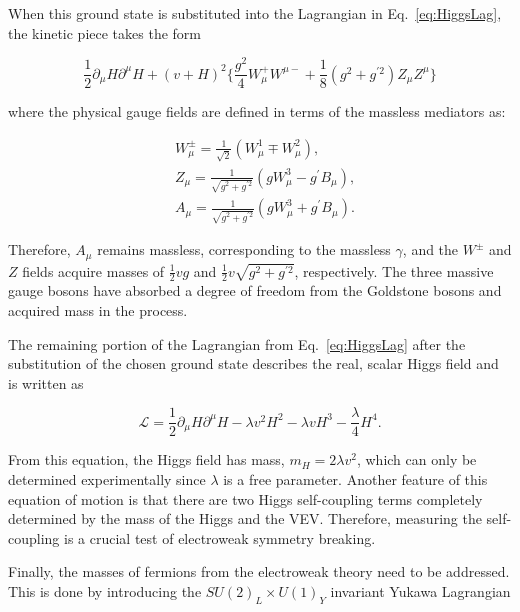 \noindent
When this ground state is substituted into the Lagrangian in Eq.~\ref{eq:HiggsLag}, the kinetic piece takes the form

\begin{equation}
\frac{1}{2}\partial_{\mu}H\partial^{\mu}H+(v + H)^{2}\Big\{\frac{g^{2}}{4}W_{\mu}^{+}W^{\mu-}+\frac{1}{8}(g^{2}+g^{\prime 2})Z_{\mu}Z^{\mu}\Big\}
\end{equation}

\noindent
where the physical gauge fields are defined in terms of the massless mediators as:

\begin{align}
&W^{\pm}_{\mu}=\frac{1}{\sqrt{2}}(W^{1}_{\mu}\mp W^{2}_{\mu}),
\\
&Z_{\mu}=\frac{1}{\sqrt{g^{2}+g^{\prime2}}}(gW_{\mu}^{3}-g^{\prime}B_{\mu}),
\\
&A_{\mu}=\frac{1}{\sqrt{g^{2}+g^{\prime2}}}(gW_{\mu}^{3}+g^{\prime}B_{\mu}).
\end{align}

\noindent
Therefore, $A_{\mu}$ remains massless, corresponding to the massless $\gamma$, and the $W^{\pm}$ and $Z$ fields acquire masses of $\frac{1}{2}v g$ and $\frac{1}{2}v\sqrt{g^{2}+g^{\prime 2}}$, respectively. The three massive gauge bosons have absorbed a degree of freedom from the Goldstone bosons and acquired mass in the process.

The remaining portion of the Lagrangian from Eq.~\ref{eq:HiggsLag} after the substitution of the chosen ground state describes the real, scalar Higgs field and is written as

\begin{equation}
\mathcal{L}=\frac{1}{2}\partial_{\mu}H\partial^{\mu}H -\lambda v^{2}H^{2}-\lambda v H^{3}-\frac{\lambda}{4}H^{4}.
\end{equation}

\noindent
From this equation, the Higgs field has mass, $m_{H}=2\lambda v^{2}$, which can only be determined experimentally since $\lambda$ is a free parameter. Another feature of this equation of motion is that there are two Higgs self-coupling terms completely determined by the mass of the Higgs and the VEV. Therefore, measuring the self-coupling is a crucial test of electroweak symmetry breaking.

Finally, the masses of fermions from the electroweak theory need to be addressed. This is done by introducing the $SU(2)_{L}\times U(1)_{Y}$ invariant Yukawa Lagrangian

